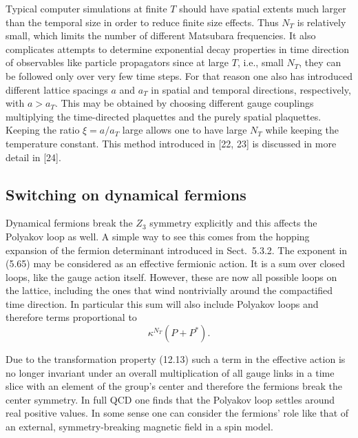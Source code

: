 Typical computer simulations at finite $T$ should have spatial extents much
larger than the temporal size in order to reduce finite size effects. Thus
$N_T$ is relatively small, which limits the number of different Matsubara
frequencies. It also complicates attempts to determine exponential decay
properties in time direction of observables like particle propagators since at
large $T$, i.e., small $N_T$, they can be followed only over very few time
steps. For that reason one also has introduced different lattice spacings $a$
and $a_T$ in spatial and temporal directions, respectively, with $a > a_T$.
This may be obtained by choosing different gauge couplings multiplying the
time-directed plaquettes and the purely spatial plaquettes. Keeping the ratio
$\xi = a/a_T$ large allows one to have large $N_T$ while keeping the
temperature constant. This method introduced in [22, 23] is discussed in more
detail in [24].

\subsection{Switching on dynamical fermions}

Dynamical fermions break the $Z_3$ symmetry explicitly and this affects the
Polyakov loop as well. A simple way to see this comes from the hopping
expansion of the fermion determinant introduced in Sect.~5.3.2. The exponent in
(5.65) may be considered as an effective fermionic action. It is a sum over
closed loops, like the gauge action itself. However, these are now all possible
loops on the lattice, including the ones that wind nontrivially around the
compactified time direction. In particular this sum will also include Polyakov
loops and therefore terms proportional to
\begin{equation}
  \kappa^{N_T}\left(P + P^*\right).
\end{equation}

Due to the transformation property (12.13) such a term in the effective action
is no longer invariant under an overall multiplication of all gauge links in a
time slice with an element of the group's center and therefore the fermions
break the center symmetry. In full QCD one finds that the Polyakov loop settles
around real positive values. In some sense one can consider the fermions' role
like that of an external, symmetry-breaking magnetic field in a spin model.


